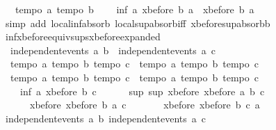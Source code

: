 \begin{isabellebody}
\ \ {\isasymlbrakk}\ tempo{}\ a{\isacharsemicolon}\ tempo{}\ b\ {\isasymrbrakk}\ {\isasymLongrightarrow}\isanewline
\ \ inf\ a\ {\isacharparenleft}xbefore\ b\ a{\isacharparenright}\ {\isacharequal}\ xbefore\ b\ a{\isachardoublequoteclose}\isanewline
%
\isadelimproof
%
\endisadelimproof
%
\isatagproof
{}\isamarkupfalse%
\ {\isacharparenleft}simp\ add{\isacharcolon}\ local{\isachardot}inf{\isachardot}absorb{}\ local{\isachardot}sup{\isachardot}absorb{\isacharunderscore}iff{}\ xbefore{\isacharunderscore}sup{\isacharunderscore}absorb{\isacharunderscore}{}b{\isacharparenright}%
\endisatagproof
{\isafoldproof}%
%
\isadelimproof
\isanewline
%
\endisadelimproof
\isanewline
\isanewline
{}\isamarkupfalse%
\ inf{\isacharunderscore}xbefore{\isacharunderscore}equiv{\isacharunderscore}sups{\isacharunderscore}xbefore{\isacharunderscore}expanded{\isacharcolon}\ \isanewline
\ \ {\isachardoublequoteopen}independent{\isacharunderscore}events\ a\ b\ {\isasymLongrightarrow}\ independent{\isacharunderscore}events\ a\ c\ {\isasymLongrightarrow}\ \isanewline
\ \ {\isasymlbrakk}tempo{}\ a{\isacharsemicolon}\ tempo{}\ b{\isacharsemicolon}\ tempo{}\ c{\isasymrbrakk}\ {\isasymLongrightarrow}\ {\isasymlbrakk}tempo{}\ a{\isacharsemicolon}\ tempo{}\ b{\isacharsemicolon}\ tempo{}\ c{\isasymrbrakk}\ {\isasymLongrightarrow}\ \isanewline
\ \ {\isasymlbrakk}tempo{}\ a{\isacharsemicolon}\ tempo{}\ b{\isacharsemicolon}\ tempo{}\ c{\isasymrbrakk}\ {\isasymLongrightarrow}\ {\isasymlbrakk}tempo{}\ a{\isacharsemicolon}\ tempo{}\ b{\isacharsemicolon}\ tempo{}\ c{\isasymrbrakk}\ {\isasymLongrightarrow}\ \isanewline
\ \ \ \ inf\ a\ {\isacharparenleft}xbefore\ b\ c{\isacharparenright}\ {\isacharequal}\ \isanewline
\ \ \ \ sup\ {\isacharparenleft}sup\ {\isacharparenleft}xbefore\ {\isacharparenleft}xbefore\ a\ b{\isacharparenright}\ c{\isacharparenright}\ \isanewline
\ \ \ \ \ \ {\isacharparenleft}xbefore\ {\isacharparenleft}xbefore\ b\ a{\isacharparenright}\ c{\isacharparenright}{\isacharparenright}\ \isanewline
\ \ \ \ \ \ {\isacharparenleft}xbefore\ {\isacharparenleft}xbefore\ b\ c{\isacharparenright}\ a{\isacharparenright}{\isachardoublequoteclose}\isanewline
%
\isadelimproof
%
\endisadelimproof
%
\isatagproof
{}\isamarkupfalse%
{\isacharminus}\isanewline
\ \ \isamarkupfalse%
\ {\isachardoublequoteopen}independent{\isacharunderscore}events\ a\ b{\isachardoublequoteclose}\ {\isachardoublequoteopen}independent{\isacharunderscore}events\ a\ c{\isachardoublequoteclose}\ \isanewline

\end{isabellebody}

